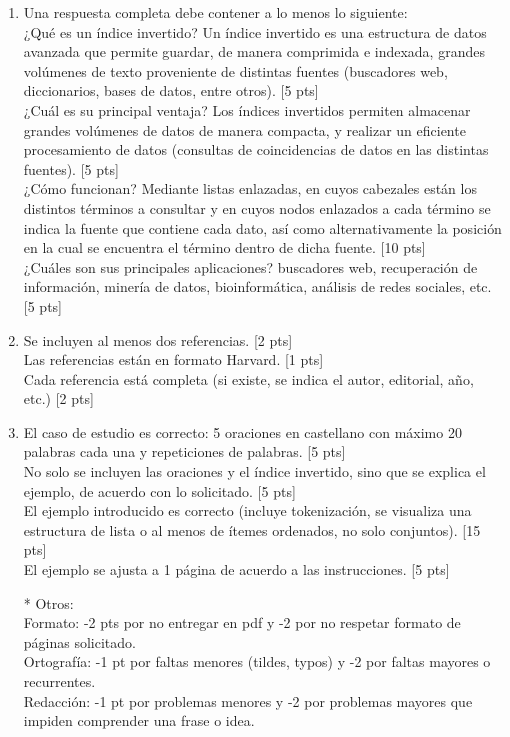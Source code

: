 \documentclass[letter,12pt,oneside]{book}
\theoremstyle{definition}
\begin{document}
\begin{enumerate}
  \item Una respuesta completa debe contener a lo menos lo siguiente:\\
  ¿Qué es un índice invertido? Un índice invertido es una estructura de datos avanzada que permite guardar, de manera comprimida e indexada, grandes volúmenes de texto proveniente de distintas fuentes (buscadores web, diccionarios, bases de datos, entre otros). \tabto{87ex} [5 pts]\\
  ¿Cuál es su principal ventaja? Los índices invertidos permiten almacenar grandes volúmenes de datos de manera compacta, y realizar un eficiente procesamiento de datos (consultas de coincidencias de datos en las distintas fuentes).\tabto{87ex} [5 pts]\\
  ¿Cómo funcionan? Mediante listas enlazadas, en cuyos cabezales están los distintos términos a consultar y en cuyos nodos enlazados a cada término se indica la fuente que contiene cada dato, así como alternativamente la posición en la cual se encuentra el término dentro de dicha fuente.\tabto{86ex} [10 pts]\\
  ¿Cuáles son sus principales aplicaciones? buscadores web, recuperación de información, minería de datos, bioinformática, análisis de redes sociales, etc. \tabto{87ex} [5 pts]
  \item Se incluyen al menos dos referencias.\tabto{87ex} [2 pts]\\
  Las referencias están en formato Harvard.\tabto{87ex} [1 pts]\\
  Cada referencia está completa (si existe, se indica el autor, editorial, año, etc.)\tabto{87ex} [2 pts]
  \item El caso de estudio es correcto: 5 oraciones en castellano con máximo 20 palabras cada una y repeticiones de palabras.\tabto{87ex} [5 pts]\\
  No solo se incluyen las oraciones y el índice invertido, sino que se explica el ejemplo, de acuerdo con lo solicitado.\tabto{87ex} [5 pts]\\
  El ejemplo introducido es correcto (incluye tokenización, se visualiza una estructura de lista o al menos de ítemes ordenados, no solo conjuntos).\tabto{86ex} [15 pts]\\
  El ejemplo se ajusta a 1 página de acuerdo a las instrucciones.\tabto{87ex} [5 pts]
  \item[*] Otros:\\
  Formato: -2 pts por no entregar en pdf y -2 por no respetar formato de páginas solicitado.\\
  Ortografía: -1 pt por faltas menores (tildes, typos) y -2 por faltas mayores o recurrentes.\\
  Redacción: -1 pt por problemas menores y -2 por problemas mayores que impiden comprender una frase o idea.
\end{enumerate}
  
\end{document}

